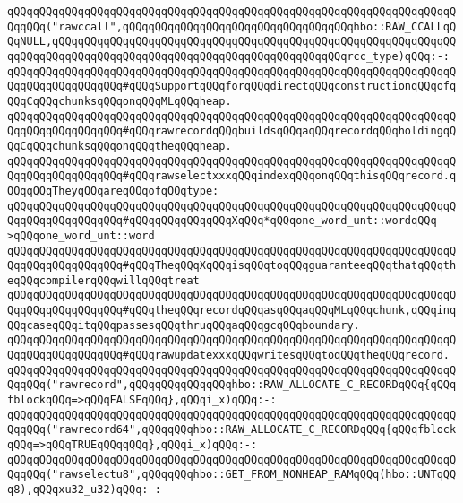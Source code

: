 \verb|qQQqqQQqqQQqqQQqqQQqqQQqqQQqqQQqqQQqqQQqqQQqqQQqqQQqqQQqqQQqqQQqqQQqqQQqqQQq("rawccall",qQQqqQQqqQQqqQQqqQQqqQQqqQQqqQQqqQQqhbo::RAW_CCALLqQQqNULL,qQQqqQQqqQQqqQQqqQQqqQQqqQQqqQQqqQQqqQQqqQQqqQQqqQQqqQQqqQQqqQQqqQQqqQQqqQQqqQQqqQQqqQQqqQQqqQQqqQQqqQQqqQQqqQQqqQQqrcc_type)qQQq:-:|\newline
\newline
\verb|qQQqqQQqqQQqqQQqqQQqqQQqqQQqqQQqqQQqqQQqqQQqqQQqqQQqqQQqqQQqqQQqqQQqqQQqqQQqqQQqqQQqqQQq#qQQqSupportqQQqforqQQqdirectqQQqconstructionqQQqofqQQqCqQQqchunksqQQqonqQQqMLqQQqheap.|\newline
\verb|qQQqqQQqqQQqqQQqqQQqqQQqqQQqqQQqqQQqqQQqqQQqqQQqqQQqqQQqqQQqqQQqqQQqqQQqqQQqqQQqqQQqqQQq#qQQqrawrecordqQQqbuildsqQQqaqQQqrecordqQQqholdingqQQqCqQQqchunksqQQqonqQQqtheqQQqheap.|\newline
\verb|qQQqqQQqqQQqqQQqqQQqqQQqqQQqqQQqqQQqqQQqqQQqqQQqqQQqqQQqqQQqqQQqqQQqqQQqqQQqqQQqqQQqqQQq#qQQqrawselectxxxqQQqindexqQQqonqQQqthisqQQqrecord.qQQqqQQqTheyqQQqareqQQqofqQQqtype:|\newline
\verb|qQQqqQQqqQQqqQQqqQQqqQQqqQQqqQQqqQQqqQQqqQQqqQQqqQQqqQQqqQQqqQQqqQQqqQQqqQQqqQQqqQQqqQQq#qQQqqQQqqQQqqQQqXqQQq*qQQqone_word_unt::wordqQQq->qQQqone_word_unt::word|\newline
\verb|qQQqqQQqqQQqqQQqqQQqqQQqqQQqqQQqqQQqqQQqqQQqqQQqqQQqqQQqqQQqqQQqqQQqqQQqqQQqqQQqqQQqqQQq#qQQqTheqQQqXqQQqisqQQqtoqQQqguaranteeqQQqthatqQQqtheqQQqcompilerqQQqwillqQQqtreat|\newline
\verb|qQQqqQQqqQQqqQQqqQQqqQQqqQQqqQQqqQQqqQQqqQQqqQQqqQQqqQQqqQQqqQQqqQQqqQQqqQQqqQQqqQQqqQQq#qQQqtheqQQqrecordqQQqasqQQqaqQQqMLqQQqchunk,qQQqinqQQqcaseqQQqitqQQqpassesqQQqthruqQQqaqQQqgcqQQqboundary.|\newline
\verb|qQQqqQQqqQQqqQQqqQQqqQQqqQQqqQQqqQQqqQQqqQQqqQQqqQQqqQQqqQQqqQQqqQQqqQQqqQQqqQQqqQQqqQQq#qQQqrawupdatexxxqQQqwritesqQQqtoqQQqtheqQQqrecord.|\newline
\newline
\verb|qQQqqQQqqQQqqQQqqQQqqQQqqQQqqQQqqQQqqQQqqQQqqQQqqQQqqQQqqQQqqQQqqQQqqQQqqQQq("rawrecord",qQQqqQQqqQQqqQQqhbo::RAW_ALLOCATE_C_RECORDqQQq{qQQqfblockqQQq=>qQQqFALSEqQQq},qQQqi_x)qQQq:-:|\newline
\verb|qQQqqQQqqQQqqQQqqQQqqQQqqQQqqQQqqQQqqQQqqQQqqQQqqQQqqQQqqQQqqQQqqQQqqQQqqQQq("rawrecord64",qQQqqQQqhbo::RAW_ALLOCATE_C_RECORDqQQq{qQQqfblockqQQq=>qQQqTRUEqQQqqQQq},qQQqi_x)qQQq:-:|\newline
\newline
\verb|qQQqqQQqqQQqqQQqqQQqqQQqqQQqqQQqqQQqqQQqqQQqqQQqqQQqqQQqqQQqqQQqqQQqqQQqqQQq("rawselectu8",qQQqqQQqhbo::GET_FROM_NONHEAP_RAMqQQq(hbo::UNTqQQq8),qQQqxu32_u32)qQQq:-:|\newline
